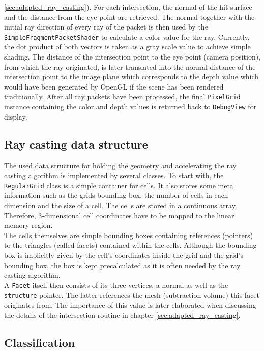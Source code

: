 \ref{sec:adapted_ray_casting}). For each intersection, the normal of the hit surface and the distance from the eye point are retrieved. The normal together with the initial ray direction of every ray of the packet is then used by the \lstinline!SimpleFragmentPacketShader! to calculate a color value for the ray. Currently, the dot product of both vectors is taken as a gray scale value to achieve simple shading. The distance of the intersection point to the eye point (camera position), from which the ray originated, is later translated into the normal distance of the intersection point to the image plane which corresponds to the depth value which would have been generated by OpenGL if the scene has been rendered traditionally. After all ray packets have been processed, the final \lstinline!PixelGrid! instance containing the color and depth values is returned back to \lstinline!DebugView! for display.

\subsection{Ray casting data structure}
\label{sec:data_structure}

The used data structure for holding the geometry and accelerating the ray casting algorithm is implemented by several classes. To start with, the \lstinline!RegularGrid! class is a simple container for cells. It also stores some meta information such as the grids bounding box, the number of cells in each dimension and the size of a cell. The cells are stored in a continuous array. Therefore, 3-dimensional cell coordinates have to be mapped to the linear memory region. \\
The cells themselves are simple bounding boxes containing references (pointers) to the triangles (called facets) contained within the cells. Although the bounding box is implicitly given by the cell's coordinates inside the grid and the grid's bounding box, the box is kept precalculated as it is often needed by the ray casting algorithm. \\
A \lstinline!Facet! itself then consists of its three vertices, a normal as well as the \lstinline!structure! pointer. The latter references the mesh (subtraction volume) this facet originates from. The importance of this value is later elaborated when discussing the details of the intersection routine in chapter \ref{sec:adapted_ray_casting}.

\subsection{Classification}
\label{sec:classification}

